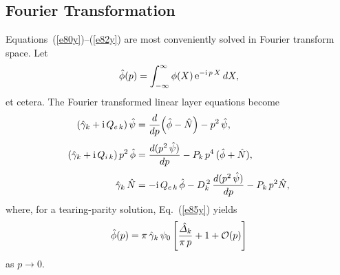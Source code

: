 \documentclass[12pt,prb,aps]{revtex4-1}
\begin{document}
\subsection{Fourier Transformation}\label{ft}
Equations~(\ref{e80y})--(\ref{e82y}) are most conveniently solved in Fourier transform space.\cite{cole}
Let
\begin{equation}\label{e86a}
\hat{\phi}(p) = \int_{-\infty}^\infty \phi(X)\,{\rm e}^{-{\rm i}\,p\,X}\,dX,
\end{equation}
et cetera. The Fourier transformed linear layer equations become
\begin{align}\label{e314}
(\hat{\gamma}_k+{\rm i}\,Q_{e\,k})\,\hat{\psi}&=\frac{d}{d p}\!\left(\hat{\phi}-\hat{N}\right)-p^2\,\hat{\psi},\\[0.5ex]
(\hat{\gamma}_k+{\rm i}\,Q_{i\,k})\,p^2\,\hat{\phi}&=  \frac{d (p^2\,\hat{\psi})}{d p}- P_k\,p^4\,(\hat{\phi} +\hat{N}),\\[0.5ex]
\hat{\gamma}_k\,\hat{N} &= - {\rm i}\,Q_{e\,k}\,\hat{\phi} -D_k^{\,2}\,\frac{d (p^2\,\hat{\psi})}{d p}
  - P_k\,p^2\hat{N},\label{e316}
\end{align}
where, for a tearing-parity solution, Eq.~(\ref{e85y}) yields\,\cite{ed}
\begin{equation}\label{e94y}
\hat{\phi}(p) =\pi\,\hat{\gamma}_k\,\psi_0\left[\frac{\hat{\mit\Delta}_k}{\pi\,p} + 1+ {\cal O}(p)\right]
\end{equation}
as $p\rightarrow 0$. 
\end{document}
